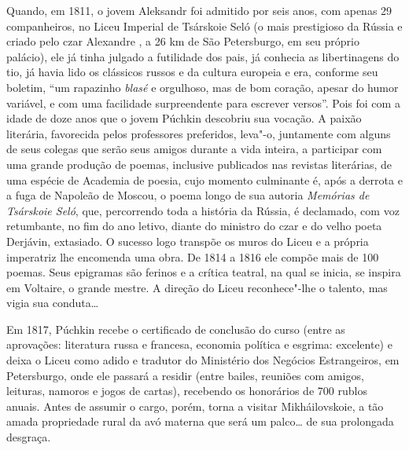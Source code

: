 Quando, em 1811, o jovem Aleksandr foi admitido por seis anos, com apenas
29 companheiros, no Liceu Imperial de Tsárskoie Seló (o mais
prestigioso da Rússia e criado pelo czar Alexandre , a 26 km de São
Petersburgo, em seu próprio palácio), ele já tinha julgado a futilidade
dos pais, já conhecia as libertinagens do tio, já havia lido os
clássicos russos e da cultura europeia e era, conforme seu boletim, ``um
rapazinho \emph{blasé} e orgulhoso, mas de bom coração, apesar do humor
variável, e com uma facilidade surpreendente para escrever versos''.
Pois foi com a idade de doze anos que o jovem Púchkin descobriu sua
vocação. A paixão literária, favorecida pelos professores preferidos,
leva"-o, juntamente com alguns de seus colegas que serão seus amigos
durante a vida inteira, a participar com uma grande produção de poemas,
inclusive publicados nas revistas literárias, de uma espécie de Academia
de poesia, cujo momento culminante é, após a derrota e a fuga de
Napoleão de Moscou, o poema longo de sua autoria \emph{Memórias de
Tsárskoie Seló}, que, percorrendo toda a história da Rússia, é declamado, com voz retumbante, no fim do ano letivo, diante do
ministro do czar e do velho poeta Derjávin, extasiado. O sucesso logo
transpõe os muros do Liceu e a própria imperatriz lhe encomenda uma
obra. De 1814 a 1816 ele compõe mais de 100 poemas. Seus epigramas são
ferinos e a crítica teatral, na qual se inicia, se inspira em Voltaire, o
grande mestre. A direção do Liceu reconhece"-lhe o talento, mas vigia sua
conduta\ldots{}

Em 1817, Púchkin recebe o certificado de conclusão do curso (entre as
aprovações: literatura russa e francesa, economia política e esgrima:
excelente) e deixa o Liceu como adido e tradutor do Ministério
dos Negócios Estrangeiros, em Petersburgo, onde ele passará a residir
(entre bailes, reuniões com amigos, leituras, namoros e jogos de
cartas), recebendo os honorários de 700 rublos anuais. Antes de assumir
o cargo, porém, torna a visitar Mikháilovskoie, a tão amada propriedade
rural da avó materna que será um palco\ldots{} de sua prolongada desgraça.

